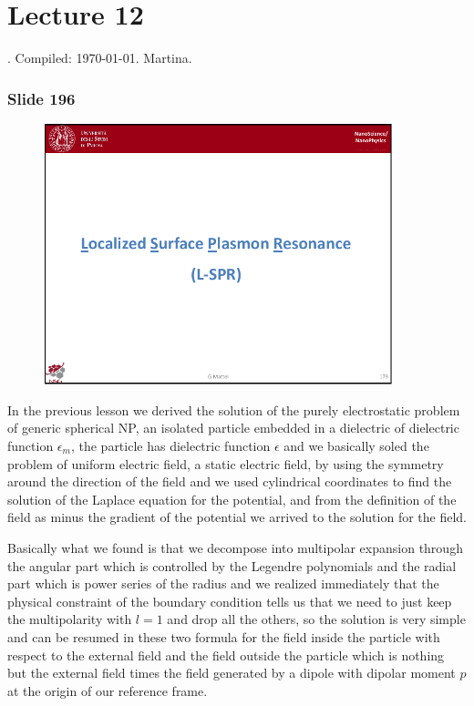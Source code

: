 \documentclass[../main/main.tex]{subfiles}
\begin{document}
\section{Lecture 12}
 . Compiled:  \today. Martina.

\subsubsection{Slide 196}

\begin{figure}[h!]
\centering
\includegraphics[page=18,width=0.9\textwidth]{../lessons/pdf_file/11_lesson.pdf}
\end{figure}


In the previous lesson we derived the solution of the purely electrostatic problem of generic spherical NP, an isolated particle embedded in a dielectric of dielectric function $\epsilon_m$, the particle has dielectric function $\epsilon$ and we basically soled the problem of uniform electric field, a static electric field, by using the symmetry around the direction of the field and we used cylindrical coordinates to find the solution of the Laplace equation for the potential, and from the definition of the field as minus the gradient of the potential we arrived to the solution for the field.

Basically what we found is that we decompose into multipolar expansion through the angular part which is controlled by the Legendre polynomials and the radial part which is power series of the radius and we realized immediately that the physical constraint of the boundary condition tells us that we need to just keep the multipolarity with $l=1$ and drop all the others, so the solution is very simple and can be resumed in these two formula for the field inside the particle with respect to the external field and the field outside the particle which is nothing but the external field times the field generated by a dipole with dipolar moment $p$ at the origin of our reference frame.
\end{document}
